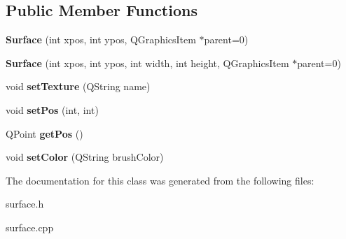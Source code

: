 \subsection*{Public Member Functions}
\begin{DoxyCompactItemize}
\item 
\hypertarget{class_surface_ac03bea7e4e17982fd17f8a571035a6f0}{}{\bfseries Surface} (int xpos, int ypos, Q\+Graphics\+Item $\ast$parent=0)\label{class_surface_ac03bea7e4e17982fd17f8a571035a6f0}

\item 
\hypertarget{class_surface_a3e1af81e4723f854196608b966a86415}{}{\bfseries Surface} (int xpos, int ypos, int width, int height, Q\+Graphics\+Item $\ast$parent=0)\label{class_surface_a3e1af81e4723f854196608b966a86415}

\item 
\hypertarget{class_surface_aa47fe5aa52e8b6fc89b9598a31b0eebb}{}void {\bfseries set\+Texture} (Q\+String name)\label{class_surface_aa47fe5aa52e8b6fc89b9598a31b0eebb}

\item 
\hypertarget{class_surface_a025ed38853ae95be3c6fe8814711ffc3}{}void {\bfseries set\+Pos} (int, int)\label{class_surface_a025ed38853ae95be3c6fe8814711ffc3}

\item 
\hypertarget{class_surface_acbdbf91a4cca74bb9da6c8a2fa932cd7}{}Q\+Point {\bfseries get\+Pos} ()\label{class_surface_acbdbf91a4cca74bb9da6c8a2fa932cd7}

\item 
\hypertarget{class_surface_ab7dd076ec71f2d6a63fe60f6c011786b}{}void {\bfseries set\+Color} (Q\+String brush\+Color)\label{class_surface_ab7dd076ec71f2d6a63fe60f6c011786b}

\end{DoxyCompactItemize}


The documentation for this class was generated from the following files\+:\begin{DoxyCompactItemize}
\item 
surface.\+h\item 
surface.\+cpp\end{DoxyCompactItemize}
